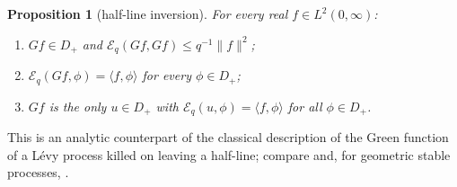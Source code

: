 \documentclass[11pt]{amsart}
\newcommand{\E}{\mathcal{E}}
\newtheorem{proposition}[theorem]{Proposition}
\theoremstyle{definition}
\theoremstyle{remark}
\numberwithin{equation}{section}
\begin{document}
\begin{proposition}[half-line inversion]\label{prop:WH}
For every real $f\in L^2(0,\infty)$:
\begin{enumerate}
\item[(i)] $Gf\in D_+$ and $\E_q(Gf,Gf)\le q^{-1}\|f\|^2$;
\item[(ii)] $\E_q(Gf,\phi)=\langle f,\phi\rangle$ for every $\phi\in D_+$;
\item[(iii)] $Gf$ is the only $u\in D_+$ with $\E_q(u,\phi)=\langle f,\phi\rangle$ for all $\phi\in D_+$.
\end{enumerate}
\end{proposition}

This is an analytic counterpart of the classical description of the Green function of a L\'evy process killed on leaving a half-line; compare \cite[Thm.~VI.20]{Bertoin96} and, for geometric stable processes, \cite[Lemma~4.3]{GR12}.
\end{document}
